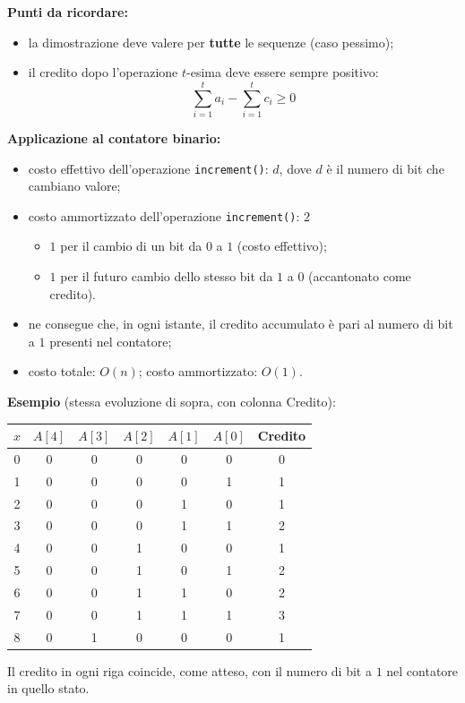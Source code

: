 \documentclass[12pt, a4paper]{article}
\begin{document}
\textbf{Punti da ricordare:}
\begin{itemize}
    \item la dimostrazione deve valere per \textbf{tutte} le sequenze (caso pessimo);
    \item il credito dopo l'operazione $t$-esima deve essere sempre positivo:
    $$\sum_{i=1}^t a_i - \sum_{i=1}^t c_i \ge 0$$
\end{itemize}

\textbf{Applicazione al contatore binario:}
\begin{itemize}
    \item costo effettivo dell'operazione \texttt{increment()}: $d$, dove $d$ è il numero di bit che cambiano valore;
    \item costo ammortizzato dell'operazione \texttt{increment()}: $2$
    \begin{itemize}
        \item $1$ per il cambio di un bit da $0$ a $1$ (costo effettivo);
        \item $1$ per il futuro cambio dello stesso bit da $1$ a $0$ (accantonato come credito).
    \end{itemize}
    \item ne consegue che, in ogni istante, il credito accumulato è pari al numero di bit a $1$ presenti nel contatore;
    \item costo totale: $O(n)$; costo ammortizzato: $O(1)$.
\end{itemize}

\textbf{Esempio} (stessa evoluzione di sopra, con colonna Credito):
\begin{center}
\begin{tabular}{c|ccccc|c}
\toprule
$x$ & $A[4]$ & $A[3]$ & $A[2]$ & $A[1]$ & $A[0]$ & \textbf{Credito} \\
\midrule
0 & 0&0&0&0&0 & 0\\
1 & 0&0&0&0&1 & 1\\
2 & 0&0&0&1&0 & 1\\
3 & 0&0&0&1&1 & 2\\
4 & 0&0&1&0&0 & 1\\
5 & 0&0&1&0&1 & 2\\
6 & 0&0&1&1&0 & 2\\
7 & 0&0&1&1&1 & 3\\
8 & 0&1&0&0&0 & 1\\
\bottomrule
\end{tabular}
\end{center}
Il credito in ogni riga coincide, come atteso, con il numero di bit a $1$ nel contatore in quello stato.
\end{document}
